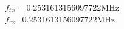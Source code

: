 \documentclass[preview]{standalone}
\begin{document}
\begin{center}
$f_{tx}=$0.2531613156097722MHz\\$f_{rx}$=0.2531613156097722MHz
\end{center}
\end{document}
